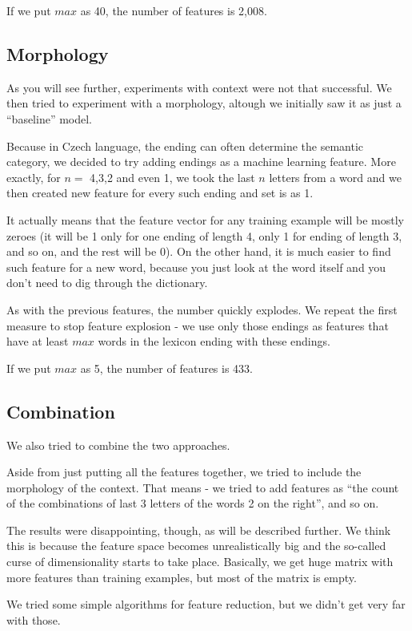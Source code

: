 \documentclass[letterpaper]{article}
\begin{document}
If we put $max$ as 40, the number of features is 2,008.

\subsection{Morphology}
As you will see further, experiments with context were not that successful. 
We then tried to experiment with a morphology, altough we initially saw it as just a ``baseline'' model.

Because in Czech language, the ending can often determine the semantic category, 
we decided to try adding endings as a machine learning feature. 
More exactly, for $n=$ 4,3,2 and even 1, we took the last $n$ letters from 
a word and we then created new feature for every such ending and set is as 1.

It actually means that the feature vector for any training example will be mostly zeroes 
(it will be 1 only for one ending of length 4, only 1 for ending of length 3, and so on, 
and the rest will be 0). On the other hand, it is much easier to find such feature 
for a new word, because you just look at the word itself and you don't need to dig through the dictionary.

As with the previous features, the number quickly explodes. We repeat the first measure 
to stop feature explosion - we use only those endings as features that have at least $max$ words in the lexicon ending with these endings.

If we put $max$ as 5, the number of features is 433.

\subsection{Combination}
We also tried to combine the two approaches.

Aside from just putting all the features together, we tried to include the morphology of the context. 
That means - we tried to add features as ``the count of the combinations of last 3 letters of the words 2 on the right'', and so on.

The results were disappointing, though, as will be described further. 
We think this is because the feature space becomes unrealistically big and the so-called  curse of dimensionality starts to take place. Basically, we get huge matrix with more features than training examples, but most of the matrix is empty.

We tried some simple algorithms for feature reduction, but we didn't get very far with those.
\end{document}
